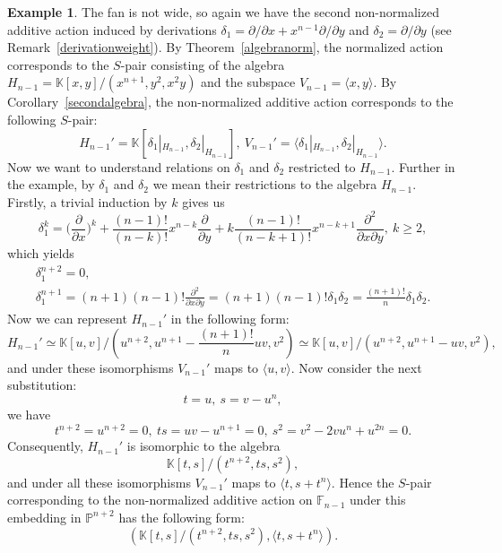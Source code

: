 \documentclass[a4paper,draft,reqno,12pt]{amsart}
\theoremstyle{definition}
\theoremstyle{definition}
\newtheorem{example}{Example}
\theoremstyle{remark}
\def\BK{{\mathbb K}}
\def\BF{{\mathbb F}}
\def\BK{{\mathbb K}}
\def\BP{{\mathbb P}}
\begin{document}
\begin{example}
    The fan is not wide, so again we have the second non-normalized additive action induced by derivations $\delta_1 = \partial/\partial x + x^{n-1}\partial/\partial y$ and $\delta_2 = \partial/\partial y$ (see Remark~\ref{derivationweight}). By Theorem~\ref{algebranorm}, the normalized action corresponds to the $S$-pair consisting of the algebra $H_{n-1}=\BK[x,y]/(x^{n+1},y^2,x^2y)$ and the subspace $V_{n-1}=\langle x,y\rangle$. By Corollary~\ref{secondalgebra}, the non-normalized additive action corresponds to the following $S$-pair:\begin{equation}
        H_{n-1}'= \BK[\delta_1|_{H_{n-1}},\delta_2|_{H_{n-1}}], \ V_{n-1}' = \langle\delta_1|_{H_{n-1}},\delta_2|_{H_{n-1}}\rangle.
    \end{equation}
    Now we want to understand relations on $\delta_1$ and $\delta_2$ restricted to $H_{n-1}$. Further in the example, by $\delta_1$ and $\delta_2$ we mean their restrictions to the algebra $H_{n-1}.$  Firstly, a trivial induction by $k$ gives us\begin{equation*}
        \delta_1^k = \Big(\frac{\partial}{\partial x}\Big)^k+\frac{(n-1)!}{(n-k)!}x^{n-k}\frac{\partial}{\partial y} + k\frac{(n-1)!}{(n-k+1)!}x^{n-k+1}\frac{\partial^2}{\partial x\partial y}, \ k\geq 2,
    \end{equation*} which yields\begin{gather*}
        \delta_1^{n+2} = 0, \\ \delta_1^{n+1} = (n+1)(n-1)!\frac{\partial^2}{\partial x\partial y} = (n+1)(n-1)!\delta_1\delta_2 = \frac{(n+1)!}{n}\delta_1\delta_2.
    \end{gather*}
    Now we can represent $H_{n-1}'$ in the following form:\begin{equation}
        H_{n-1}'\simeq\BK[u,v]/(u^{n+2}, u^{n+1}-\frac{(n+1)!}{n}uv, v^2)\simeq\BK[u,v]/(u^{n+2}, u^{n+1}-uv,v^2),
    \end{equation} and under these isomorphisms $V_{n-1}'$ maps to $\langle u, v\rangle$. Now consider the next substitution:\begin{equation*}
        t = u, \ s = v - u^n,
    \end{equation*}we have \begin{equation*}
        t^{n+2}=u^{n+2} = 0, \ ts = uv -u^{n+1} = 0, \ s^2 = v^2-2vu^{n}+u^{2n}=0.
    \end{equation*}Consequently, $H_{n-1}'$ is isomorphic to the algebra \begin{equation*}
        \BK[t,s]/(t^{n+2},ts,s^2),
    \end{equation*} and under all these isomorphisms $V_{n-1}'$ maps to $\langle t,s+t^n\rangle$. Hence the $S$-pair corresponding to the non-normalized additive action on $\BF_{n-1}$ under this embedding in $\BP^{n+2}$ has the following form:\begin{equation}
        (\BK[t,s]/(t^{n+2},ts,s^2), \langle t,s+t^n\rangle).
    \end{equation}
\end{example}
\end{document}
